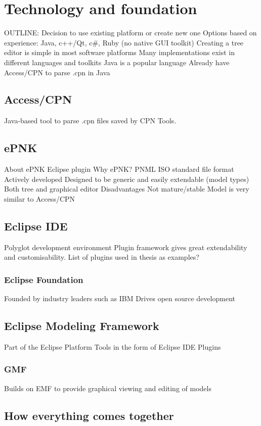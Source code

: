 \chapter{Technology and foundation}
\label{chap:technology}

OUTLINE:
Decision to use existing platform or create new one
	Options based on experience: Java, c++/Qt, c\#, Ruby (no native GUI toolkit)
	Creating a tree editor is simple in most software platforms
	Many implementations exist in different languages and toolkits
	Java is a popular language
	Already have Access/CPN to parse .cpn in Java
	
\section{Access/CPN}
Java-based tool to parse .cpn files saved by CPN Tools.

	
\section{ePNK}
About ePNK
	Eclipse plugin
Why ePNK?
	PNML ISO standard file format
	Actively developed
	Designed to be generic and easily extendable (model types)
	Both tree and graphical editor
Disadvantages
	Not mature/stable
Model is very similar to Access/CPN


\section{Eclipse IDE}
Polyglot development environment
Plugin framework gives great extendability and customisability.
List of plugins used in thesis as examples? 

	\subsection{Eclipse Foundation}
	Founded by industry leaders such as IBM
	Drives open source development



\section{Eclipse Modeling Framework}
Part of the Eclipse Platform
Tools in the form of Eclipse IDE Plugins

	\subsection{GMF}
	Builds on EMF to provide graphical viewing and editing of models

\section{How everything comes together}
